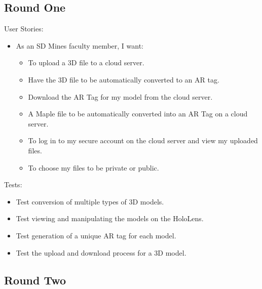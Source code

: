 
\subsection{Round One}

User Stories:
\begin{itemize}
	\item As an SD Mines faculty member, I want:
		\begin{itemize}
			\item To upload a 3D file to a cloud server.
			\item Have the 3D file to be automatically converted to an AR tag.
			\item Download the AR Tag for my model from the cloud server.
			\item A Maple file to be automatically converted into an AR Tag on a 
			cloud server.
			\item To log in to my secure account on the cloud server and view my 
			uploaded files.
			\item To choose my files to be private or public.
		\end{itemize}
\end{itemize}
Tests:
\begin{itemize}
	\item Test conversion of multiple types of 3D models.
	\item Test viewing and manipulating the models on the HoloLens.
	\item Test generation of a unique AR tag for each model.
	\item Test the upload and download process for a 3D model.
\end{itemize}

\subsection{Round Two}

